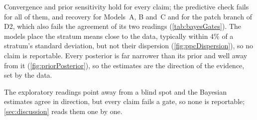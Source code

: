 Convergence and prior sensitivity hold for every claim; the predictive check fails for all of them, and recovery for Models~A, B and~C and for the patch branch of D2, which also fails the agreement of its two readings (\autoref{tab:bayesGates}). The models place the stratum means close to the data, typically within $4\%$ of a stratum's standard deviation, but not their dispersion (\autoref{fig:ppcDispersion}), so no claim is reportable. Every posterior is far narrower than its prior and well away from it (\autoref{fig:priorPosterior}), so the estimates are the direction of the evidence, set by the data.

The exploratory readings point away from a blind spot and the Bayesian estimates agree in direction, but every claim fails a gate, so none is reportable; \autoref{sec:discussion} reads them one by one.

